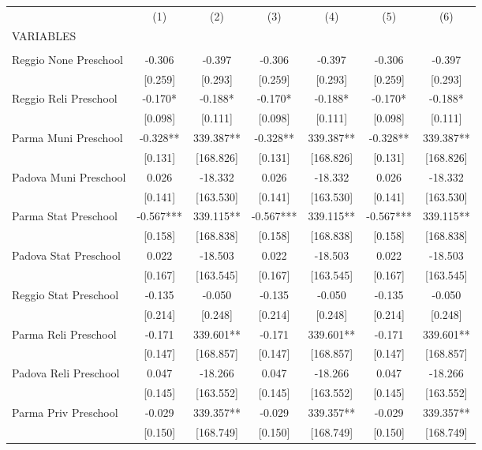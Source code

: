 \begin{tabular}{lcccccc} \hline
 & (1) & (2) & (3) & (4) & (5) & (6) \\
VARIABLES &  &  &  &  &  &  \\ \hline
 &  &  &  &  &  &  \\
Reggio None Preschool & -0.306 & -0.397 & -0.306 & -0.397 & -0.306 & -0.397 \\
 & [0.259] & [0.293] & [0.259] & [0.293] & [0.259] & [0.293] \\
Reggio Reli Preschool & -0.170* & -0.188* & -0.170* & -0.188* & -0.170* & -0.188* \\
 & [0.098] & [0.111] & [0.098] & [0.111] & [0.098] & [0.111] \\
Parma Muni Preschool & -0.328** & 339.387** & -0.328** & 339.387** & -0.328** & 339.387** \\
 & [0.131] & [168.826] & [0.131] & [168.826] & [0.131] & [168.826] \\
Padova Muni Preschool & 0.026 & -18.332 & 0.026 & -18.332 & 0.026 & -18.332 \\
 & [0.141] & [163.530] & [0.141] & [163.530] & [0.141] & [163.530] \\
Parma Stat Preschool & -0.567*** & 339.115** & -0.567*** & 339.115** & -0.567*** & 339.115** \\
 & [0.158] & [168.838] & [0.158] & [168.838] & [0.158] & [168.838] \\
Padova Stat Preschool & 0.022 & -18.503 & 0.022 & -18.503 & 0.022 & -18.503 \\
 & [0.167] & [163.545] & [0.167] & [163.545] & [0.167] & [163.545] \\
Reggio Stat Preschool & -0.135 & -0.050 & -0.135 & -0.050 & -0.135 & -0.050 \\
 & [0.214] & [0.248] & [0.214] & [0.248] & [0.214] & [0.248] \\
Parma Reli Preschool & -0.171 & 339.601** & -0.171 & 339.601** & -0.171 & 339.601** \\
 & [0.147] & [168.857] & [0.147] & [168.857] & [0.147] & [168.857] \\
Padova Reli Preschool & 0.047 & -18.266 & 0.047 & -18.266 & 0.047 & -18.266 \\
 & [0.145] & [163.552] & [0.145] & [163.552] & [0.145] & [163.552] \\
Parma Priv Preschool & -0.029 & 339.357** & -0.029 & 339.357** & -0.029 & 339.357** \\
 & [0.150] & [168.749] & [0.150] & [168.749] & [0.150] & [168.749] \\

\end{tabular}
